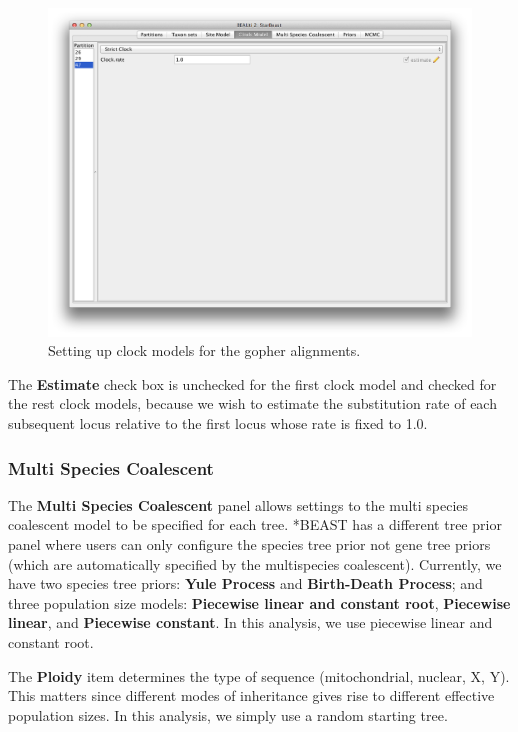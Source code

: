 \documentclass{article}
\begin{document}
\begin{figure}
\begin{center}
\includegraphics[scale=0.4,clip=true,trim=0 450 0 0]{figures/BEAUti_ClockModel3.png}

\end{center}
\caption{\label{fig.clockmodel} Setting up clock models for the gopher alignments.}
\end{figure}


The \textbf{Estimate} check box is unchecked for the first clock model and checked for the rest clock models, because we wish to estimate the substitution rate of each subsequent locus relative to the first locus whose rate is fixed to 1.0. 

\subsubsection*{Multi Species Coalescent}

The {\bf Multi Species Coalescent} panel allows settings to the multi species coalescent model to be specified for each tree. *BEAST has a different tree prior panel where users can only configure the species tree prior not gene tree priors (which are automatically specified by the multispecies coalescent). Currently, we have two species tree priors: \textbf{Yule Process} and \textbf{Birth-Death Process}; and three population size models: \textbf{Piecewise linear and constant root}, \textbf{Piecewise linear}, and \textbf{Piecewise constant}. 
In this analysis, we use {piecewise linear and constant root}.

The \textbf{Ploidy} item determines the type of sequence (mitochondrial, nuclear, X, Y). This matters since different modes of inheritance gives rise to different effective population sizes. In this analysis, we simply use a random starting tree. 
\end{document}
